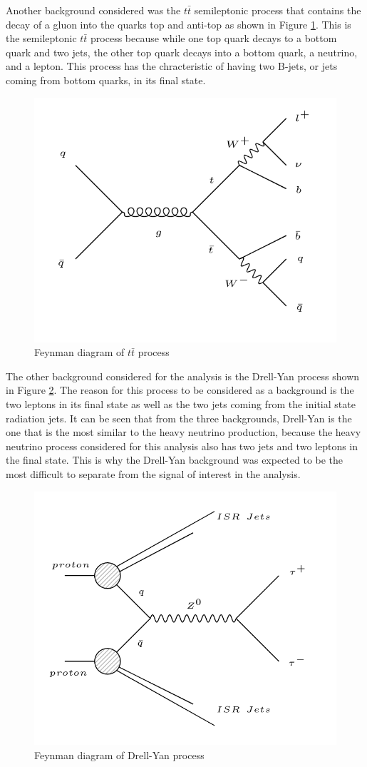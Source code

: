 Another background considered was the $t\bar{t}$ semileptonic process that contains the decay of a gluon into the quarks top and anti-top as shown in Figure \ref{fig: ttbar_background}. This is the semileptonic $t\bar{t}$ process because while one top quark decays to a bottom quark and two jets, the other top quark decays into a bottom quark, a neutrino, and a lepton. This process has the chracteristic of having two B-jets, or jets coming from bottom quarks, in its final state.


\begin{figure}[H]
\centering
\includegraphics[width = \linewidth]{ttbar}
\caption{Feynman diagram of $t\bar{t}$ process}
\label{fig: ttbar_background}
\end{figure}

The other background considered for the analysis is the Drell-Yan process shown in Figure \ref{fig: DY_background}. The reason for this process to be considered as a background is the two leptons in its final state as well as the two jets coming from the initial state radiation jets. It can be seen that from the three backgrounds, Drell-Yan is the one that is the most similar to the heavy neutrino production, because the heavy neutrino process considered for this analysis also has two jets and two leptons in the final state. This is why the Drell-Yan background was expected to be the most difficult to separate from the signal of interest in the analysis.

\begin{figure}[H]
\centering
\includegraphics[width = 0.7\linewidth]{Drell-Yan}
\caption{Feynman diagram of Drell-Yan process}
\label{fig: DY_background}
\end{figure}